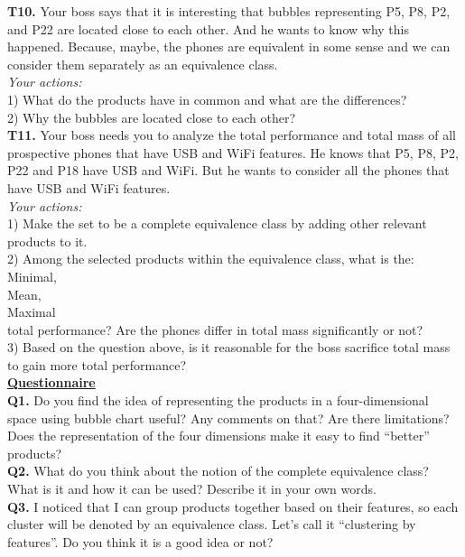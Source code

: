 \documentclass{acm_proc_article-sp}
\begin{document}
\textbf{T10.} Your boss says that it is interesting that bubbles representing P5, P8, P2, and P22 are located close to each other. And he wants to know why this happened. Because, maybe, the phones are equivalent in some sense and we can consider them separately as an equivalence class.\\
\textit{Your actions:}\\
1) What do the products have in common and what are the differences?\\
2) Why the bubbles are located close to each other?\\

\textbf{T11.} Your boss needs you to analyze the total performance and total mass of all prospective phones that have USB and WiFi features. He knows that P5, P8, P2, P22 and P18 have USB and WiFi. But he wants to consider all the phones that have USB and WiFi features.\\
\textit{Your actions:}\\
1) Make the set to be a complete equivalence class by adding other relevant products to it.\\
2) Among the selected products within the equivalence class, what is the:\\
	Minimal,\\
	Mean,\\
	Maximal\\
total performance? Are the phones differ in total mass significantly or not?\\
3) Based on the question above, is it reasonable for the boss sacrifice total mass to gain more total performance?\\

\underline{ \textbf{Questionnaire}}\\

\textbf{Q1.} Do you find the idea of representing the products in a four-dimensional space using bubble chart useful? Any comments on that? Are there limitations? Does the representation of the four dimensions make it easy to find “better” products?\\
\textbf{Q2.} What do you think about the notion of the complete equivalence class? What is it and how it can be used? Describe it in your own words.\\
\textbf{Q3.} I noticed that I can group products together based on their features, so each cluster will be denoted by an equivalence class. Let’s call it “clustering by features”. Do you think it is a good idea or not?\\



\balancecolumns
\end{document}

